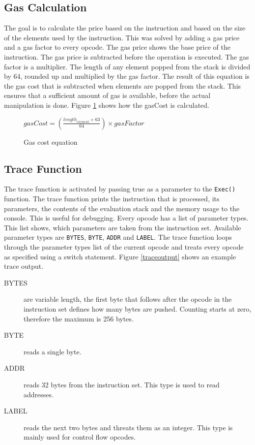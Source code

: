 \subsection{Gas Calculation}
The goal is to calculate the price based on the instruction and based on the size of the elements used by the instruction. This was solved by adding a gas price and a gas factor to every opcode. The gas price shows the base price of the instruction. The gas price is subtracted before the operation is executed. The gas factor is a multiplier. The length of any element popped from the stack is divided by 64, rounded up and multiplied by the gas factor. The result of this equation is the gas cost that is subtracted when elements are popped from the stack. This ensures that a sufficient amount of gas is available, before the actual manipulation is done. Figure \ref{gas_factor_calc} shows how the gasCost is calculated.

\begin{figure}[thp]%
    	\centering
		$
		gasCost=\left( \frac { { length }_{ element }+63 }{ 64 }  \right) \times gasFactor
		$
		\caption{Gas cost equation}
		\label{gas_factor_calc}
\end{figure}

\subsection{Trace Function}
The trace function is activated by passing true as a parameter to the \texttt{Exec()} function. The trace function prints the instruction that is processed, its parameters, the contents of the evaluation stack and the memory usage to the console. This is useful for debugging. Every opcode has a list of parameter types. This list shows, which parameters are taken from the instruction set. Available parameter types are \texttt{BYTES}, \texttt{BYTE}, \texttt{ADDR} and \texttt{LABEL}. The trace function loops through the parameter types list of the current opcode and treats every opcode as specified using a switch statement. Figure \ref{traceoutput} shows an example trace output.
\begin{description}
	\item[BYTES] are variable length, the first byte that follows after the opcode in the instruction set defines how many bytes are pushed. Counting starts at zero, therefore the maximum is 256 bytes.
	\item[BYTE] reads a single byte.
	\item[ADDR] reads 32 bytes from the instruction set. This type is used to read addresses.
	\item[LABEL] reads the next two bytes and threats them as an integer. This type is mainly used for control flow opcodes.
\end{description}

